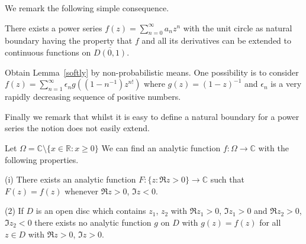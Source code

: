 We remark the following simple consequence.
\begin{lemma}\label{softly} There exists a power series 
$f(z)=\sum_{n=0}^{\infty}a_{n}z^{n}$ with the unit
circle as natural boundary having the property
that $f$ and all its derivatives can be extended
to continuous functions on $\overline{D(0,1)}$.
\end{lemma}
\begin{exercise} Obtain Lemma~\ref{softly} by
non-probabilistic means. One possibility is to consider
$f(z)=\sum_{n=1}^{\infty}\epsilon_{n}g((1-n^{-1})z^{n!})$ where
$g(z)=(1-z)^{-1}$ and $\epsilon_{n}$ is a very rapidly decreasing
sequence of positive numbers.
\end{exercise}

Finally we remark that whilst it is easy to define
a natural boundary for a power series the notion
does not easily extend.
\begin{lemma} 
Let $\Omega={\mathbb C}\setminus\{x\in{\mathbb R}:x\geq 0\}$
We  can find an analytic function $f:\Omega\rightarrow{\mathbb C}$
with the following properties.

(i) There exists an analytic function 
$F:\{z:\Re z>0\}\rightarrow{\mathbb C}$ such that $F(z)=f(z)$
whenever $\Re z>0$, $\Im z<0$.

(2) If $D$ is an open disc which contains $z_{1}$, $z_{2}$
with $\Re z_{1}>0$, $\Im z_{1}>0$ and
$\Re z_{2}>0$, $\Im z_{2}<0$ there exists no analytic
function $g$ on $D$ with $g(z)=f(z)$ for all $z\in D$
with $\Re z>0$, $\Im z>0$.
\end{lemma}

